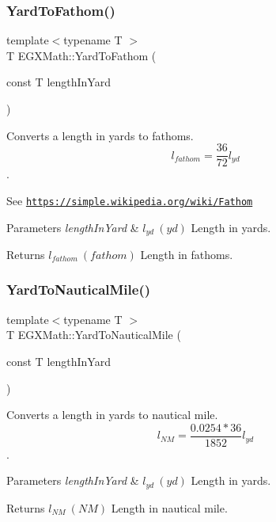 \subsubsection{\texorpdfstring{Yard\+To\+Fathom()}{YardToFathom()}}
{\footnotesize\ttfamily template$<$typename T $>$ \\
T E\+G\+X\+Math\+::\+Yard\+To\+Fathom (\begin{DoxyParamCaption}\item[{const T}]{length\+In\+Yard }\end{DoxyParamCaption})}



Converts a length in yards to fathoms. \[ l_{fathom}= \frac{36}{72} l_{yd} \]. 

See \href{https://simple.wikipedia.org/wiki/Fathom}{\tt https\+://simple.\+wikipedia.\+org/wiki/\+Fathom} 
\begin{DoxyParams}{Parameters}
{\em length\+In\+Yard} & $ l_{yd}\ (yd)$ Length in yards. \\
\hline
\end{DoxyParams}
\begin{DoxyReturn}{Returns}
$ l_{fathom}\ (fathom)$ Length in fathoms. 
\end{DoxyReturn}
\mbox{\label{group___e_g_x_math-_conversions-_length_conversions-_imperial-_yard-_nautical_gafdd0ac310bcfdaf8cf676f823018b6d7}} 
\subsubsection{\texorpdfstring{Yard\+To\+Nautical\+Mile()}{YardToNauticalMile()}}
{\footnotesize\ttfamily template$<$typename T $>$ \\
T E\+G\+X\+Math\+::\+Yard\+To\+Nautical\+Mile (\begin{DoxyParamCaption}\item[{const T}]{length\+In\+Yard }\end{DoxyParamCaption})}



Converts a length in yards to nautical mile. \[ l_{NM}= \frac{0.0254 * 36}{1852} l_{yd} \]. 


\begin{DoxyParams}{Parameters}
{\em length\+In\+Yard} & $ l_{yd}\ (yd)$ Length in yards. \\
\hline
\end{DoxyParams}
\begin{DoxyReturn}{Returns}
$ l_{NM}\ (NM)$ Length in nautical mile. 
\end{DoxyReturn}
